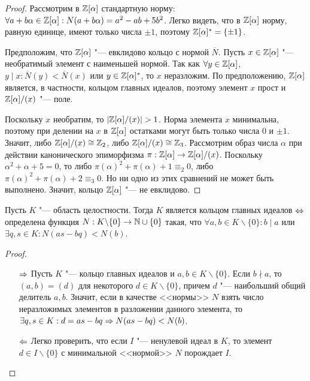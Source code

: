 \begin{proof}
	Рассмотрим в $\mathbb{Z}[\alpha]$ стандартную норму: $\forall a + b\alpha \hm\in \Z[\alpha]: N(a + b\alpha) \hm= a^2 - ab + 5b^2$. Легко видеть, что в $\mathbb{Z}[\alpha]$ норму, равную единице, имеют только числа $\pm1$, поэтому $\mathbb{Z}[\alpha]^* = \{\pm1\}$.
		
	Предположим, что $\mathbb{Z}[\alpha]$ "--- евклидово кольцо с нормой $\overline{N}$. Пусть $x \in \mathbb{Z}[\alpha]$ "--- необратимый элемент с наименьшей нормой. Так как $\forall y \in \mathbb{Z}[\alpha]$, $y \mid x: \overline{N}(y) < \overline{N}(x)$ или $y \in \mathbb{Z}[\alpha]^*$, то $x$ неразложим. По предположению, $\mathbb{Z}[\alpha]$ является, в частности, кольцом главных идеалов, поэтому элемент $x$ прост и $\mathbb{Z}[\alpha] / (x)$ "--- поле.
	
	Поскольку $x$ необратим, то $|\mathbb{Z}[\alpha] / (x)| > 1$. Норма элемента $x$ минимальна, поэтому при делении на $x$ в $\mathbb{Z}[\alpha]$ остатками могут быть только числа $0$ и $\pm1$. Значит, либо $\mathbb{Z}[\alpha] / (x) \cong \mathbb{Z}_2$, либо $\mathbb{Z}[\alpha] / (x) \cong \mathbb{Z}_3$. Рассмотрим образ числа $\alpha$ при действии канонического эпиморфизма $\pi: \mathbb{Z}[\alpha] \to \mathbb{Z}[\alpha] / (x)$. Поскольку $\alpha^2 + \alpha + 5 = 0$, то либо $\pi(\alpha)^2 + \pi(\alpha) + 1 \equiv_2 0$, либо $\pi(\alpha)^2 + \pi(\alpha) + 2 \equiv_3 0$. Но ни одно из этих сравнений не может быть выполнено. Значит, кольцо $\mathbb{Z}[\alpha]$ "--- не евклидово.
\end{proof}

\begin{proposition}
	Пусть $K$ "--- область целостности. Тогда $K$ является кольцом главных идеалов $\Leftrightarrow$ определена функция $N: K\backslash\{0\} \to \mathbb{N} \cup \{0\}$ такая, что $\forall a, b \in K\backslash\{0\}: b \mid a$ или $\exists q, s \in K: N(as - bq) < N(b)$.
\end{proposition}

\begin{proof}~
	\begin{itemize}
		\item[$\Rightarrow$] Пусть $K$ "--- кольцо главных идеалов и $a, b \in K\backslash\{0\}$. Если $b \nmid a$, то $(a, b) = (d)$ для некоторого $d \in K\backslash\{0\}$, причем $d$ "--- наибольший общий делитель $a, b$. Значит, если в качестве <<нормы>> $N$ взять число неразложимых элементов в разложении данного элемента, то $\exists q, s \in K: d = as - bq \Rightarrow N(as - bq) < N(b)$.
		\item[$\Leftarrow$] Легко проверить, что если $I$ "--- ненулевой идеал в $K$, то элемент $d \in I \backslash \{0\}$ с минимальной <<нормой>> $N$ порождает $I$.\qedhere
	\end{itemize}
\end{proof}

